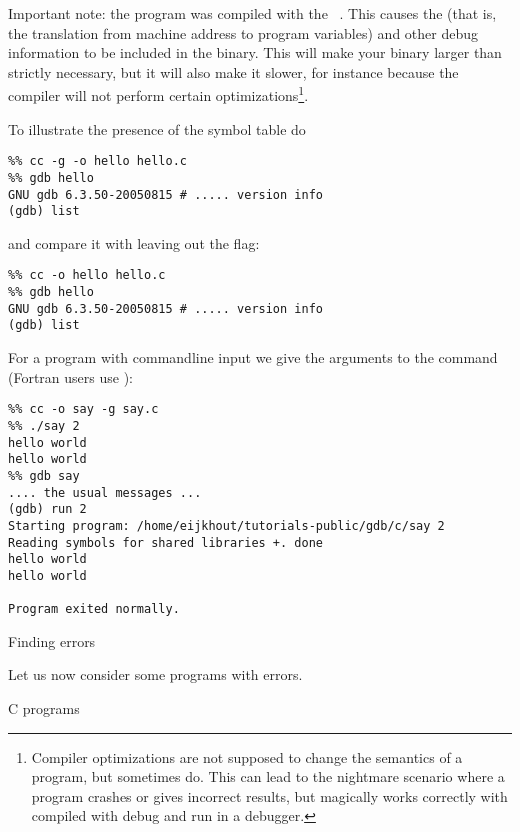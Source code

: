 Important note: the program was compiled with the ~. This causes the  (that is, the
translation from machine address to program variables) and other debug
information to be included in the binary. This will make your binary
larger than strictly necessary, but it will also make it slower, for
instance because the compiler will not perform certain
optimizations\footnote{Compiler optimizations are not supposed to
  change the semantics of a program, but sometimes do. This can lead
  to the nightmare scenario where a program crashes or gives incorrect
  results, but magically works correctly with compiled with debug and
  run in a debugger.}.

To illustrate the presence of the symbol table do
\begin{verbatim}
%% cc -g -o hello hello.c
%% gdb hello
GNU gdb 6.3.50-20050815 # ..... version info
(gdb) list
\end{verbatim}
and compare it with leaving out the  flag:
\begin{verbatim}
%% cc -o hello hello.c
%% gdb hello
GNU gdb 6.3.50-20050815 # ..... version info
(gdb) list
\end{verbatim}

For a program with commandline input we give the arguments to the
 command (Fortran users use ):
\begin{verbatim}
%% cc -o say -g say.c
%% ./say 2
hello world
hello world
%% gdb say
.... the usual messages ...
(gdb) run 2
Starting program: /home/eijkhout/tutorials-public/gdb/c/say 2
Reading symbols for shared libraries +. done
hello world
hello world

Program exited normally.
\end{verbatim}

 {Finding errors}

Let us now consider some programs with errors.

 {C programs}


